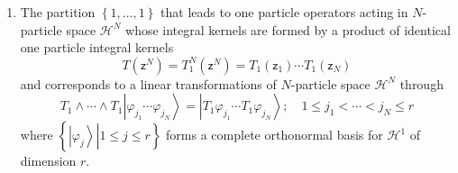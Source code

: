 \documentclass[aps,preprint]{revtex4}%
\begin{document}
\begin{enumerate}
\item The partition $\left\{  1,\ldots,1\right\}  $ that leads to one particle
operators acting in $N$-particle space $\mathcal{H}^{N}$ whose integral
kernels are formed by a product of identical one particle integral kernels
\begin{equation}
T\left(  \mathsf{z}^{N}\right)  =T_{1}^{N}\left(  \mathsf{z}^{N}\right)
=T_{1}\left(  \mathsf{z}_{1}\right)  \cdots T_{1}\left(  \mathsf{z}%
_{N}\right)
\end{equation}
and corresponds to a linear transformations of $N$-particle space
$\mathcal{H}^{N}$ through%
\begin{equation}
T_{1}\wedge\cdots\wedge T_{1}\left\vert \varphi_{j_{1}}\cdots\varphi_{j_{N}%
}\right\rangle =\left\vert T_{1}\varphi_{j_{1}}\cdots T_{1}\varphi_{j_{N}%
}\right\rangle ;\quad1\leq j_{1}<\cdots<j_{N}\leq r
\end{equation}
where $\left\{  \left.  \left\vert \varphi_{j}\right\rangle \right\vert 1\leq
j\leq r\right\}  $ forms a complete orthonormal basis for $\mathcal{H}^{1}$ of
dimension $r$.


\end{enumerate}
\end{document}
